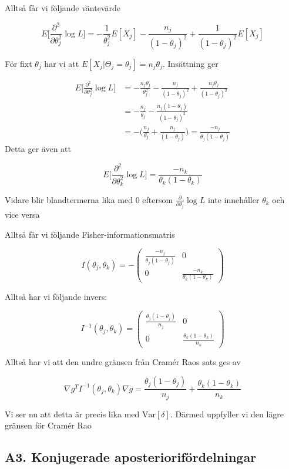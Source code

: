 \documentclass{article}
\newcommand{\var}{\text{Var}}
\begin{document}
Alltså får vi följande väntevärde

\[
E\Bigg[\frac{\partial^2}{\partial \theta_j^2}\log L\Bigg]=-\frac{1}{\theta_j^2}E[X_j]-\frac{n_j}{(1-\theta_j)^2}+\frac{1}{(1-\theta_j)^2}E[X_j]
\]

För fixt $\theta_j$ har vi att $E[X_j|\Theta_j=\theta_j]=n_j\theta_j$. Insättning ger


\[
\begin{aligned}
    E\Bigg[\frac{\partial^2}{\partial \theta_j^2}\log L\Bigg]&=-\frac{n_j\theta_j}{\theta_j^2}-\frac{n_j}{(1-\theta_j)^2    }+\frac{n_j\theta_j}{(1-\theta_j)^2}\\
    &=-\frac{n_j}{\theta_j  }-\frac{n_j(1-\theta_j)}{(1-\theta_j)^2}\\
    &=-\Big(\frac{n_j}{\theta_j}+\frac{n_j}{(1-\theta_j)}\Big)=\frac{-n_j}{\theta_j(1-\theta_j)}
\end{aligned}
\]
Detta ger även att

\[
 E\Bigg[\frac{\partial^2}{\partial \theta_k^2}\log L\Bigg]=\frac{-n_k}{\theta_k(1-\theta_k)}
\]

Vidare blir blandtermerna lika med 0 eftersom $\frac{\partial}{\partial\theta_j}\log L$ inte innehåller $\theta_k$ och vice versa

Alltså får vi följande Fisher-informationsmatris

\[
I(\theta_j,\theta_k)=-\begin{pmatrix}
    \frac{-n_j}{\theta_j(1-\theta_j)}&0\\0&\frac{-n_k}{\theta_k(1-\theta_k)}
\end{pmatrix}
\]

Alltså har vi följande invers:

\[
I^{-1}(\theta_j,\theta_k)=\begin{pmatrix}
    \frac{\theta_j(1-\theta_j)}{n_j}&0\\0&\frac{\theta_k(1-\theta_k)}{n_k}
\end{pmatrix}
\]

Alltså har vi att den undre gränsen från Cramér Raos sats ges av

\[
\nabla g^TI^{-1}(\theta_j,\theta_k)\nabla g=\frac{\theta_j(1-\theta_j)}{n_j}+\frac{\theta_k(1-\theta_k)}{n_k}
\]

Vi ser nu att detta är precis lika med $\var[\delta]$. Därmed uppfyller vi den lägre gränsen för Cramér Rao


\subsection{A3. Konjugerade aposteriorifördelningar}
\end{document}
